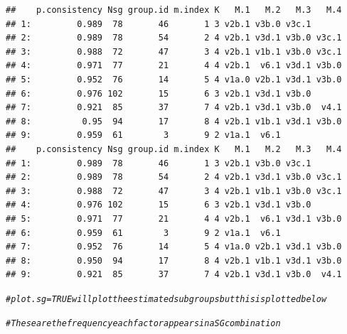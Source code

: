 \documentclass[9pt]{article}\usepackage[]{graphicx}\usepackage[]{xcolor}
\makeatletter
\newcommand{\hlcom}[1]{\textcolor[rgb]{0.678,0.584,0.686}{\textit{#1}}}%
\newenvironment{kframe}{%
 \def\at@end@of@kframe{}%
 \ifinner\ifhmode%
  \def\at@end@of@kframe{\end{minipage}}%
  \begin{minipage}{\columnwidth}%
 \fi\fi%
 \def\FrameCommand##1{\hskip\@totalleftmargin \hskip-\fboxsep
 \colorbox{shadecolor}{##1}\hskip-\fboxsep
     \hskip-\linewidth \hskip-\@totalleftmargin \hskip\columnwidth}%
 \MakeFramed {\advance\hsize-\width
   \@totalleftmargin\z@ \linewidth\hsize
   \@setminipage}}%
 {\par\unskip\endMakeFramed%
 \at@end@of@kframe}
\newenvironment{knitrout}{}{} %
\theoremstyle{definition}
\theoremstyle{remark}
\makeatother
\begin{document}
\begin{knitrout}
\begin{kframe}
\begin{verbatim}
##    p.consistency Nsg group.id m.index K   M.1   M.2   M.3   M.4
## 1:         0.989  78       46       1 3 v2b.1 v3b.0 v3c.1      
## 2:         0.989  78       54       2 4 v2b.1 v3d.1 v3b.0 v3c.1
## 3:         0.988  72       47       3 4 v2b.1 v1b.1 v3b.0 v3c.1
## 4:         0.971  77       21       4 4 v2b.1  v6.1 v3d.1 v3b.0
## 5:         0.952  76       14       5 4 v1a.0 v2b.1 v3d.1 v3b.0
## 6:         0.976 102       15       6 3 v2b.1 v3d.1 v3b.0      
## 7:         0.921  85       37       7 4 v2b.1 v3d.1 v3b.0  v4.1
## 8:          0.95  94       17       8 4 v2b.1 v1b.1 v3d.1 v3b.0
## 9:         0.959  61        3       9 2 v1a.1  v6.1            
##    p.consistency Nsg group.id m.index K   M.1   M.2   M.3   M.4
## 1:         0.989  78       46       1 3 v2b.1 v3b.0 v3c.1      
## 2:         0.989  78       54       2 4 v2b.1 v3d.1 v3b.0 v3c.1
## 3:         0.988  72       47       3 4 v2b.1 v1b.1 v3b.0 v3c.1
## 4:         0.976 102       15       6 3 v2b.1 v3d.1 v3b.0      
## 5:         0.971  77       21       4 4 v2b.1  v6.1 v3d.1 v3b.0
## 6:         0.959  61        3       9 2 v1a.1  v6.1            
## 7:         0.952  76       14       5 4 v1a.0 v2b.1 v3d.1 v3b.0
## 8:         0.950  94       17       8 4 v2b.1 v1b.1 v3d.1 v3b.0
## 9:         0.921  85       37       7 4 v2b.1 v3d.1 v3b.0  v4.1
\end{verbatim}
\begin{alltt}
\hlcom{# plot.sg=TRUE will plot the estimated subgroups but this is plotted below}

\hlcom{# These are the frequency each factor appears in a SG combination}


\end{alltt}
\end{kframe}
\end{knitrout}
\end{document}

